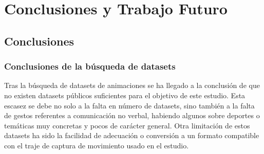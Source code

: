 \chapter{Conclusiones y Trabajo Futuro}
\label{cap:conclusiones}

\section{Conclusiones}




\subsection{Conclusiones de la búsqueda de datasets}
Tras la búsqueda de datasets de animaciones se ha llegado a la conclusión de que no existen datasets públicos suficientes para el objetivo de este estudio. Esta escasez se debe no solo a la falta en número de datasets, sino también a la falta de gestos referentes a comunicación no verbal, habiendo algunos sobre deportes o temáticas muy concretas y pocos de carácter general.  Otra limitación de estos datasets ha sido la facilidad de adecuación o conversión a un formato compatible con el traje de captura de movimiento usado en el estudio.

